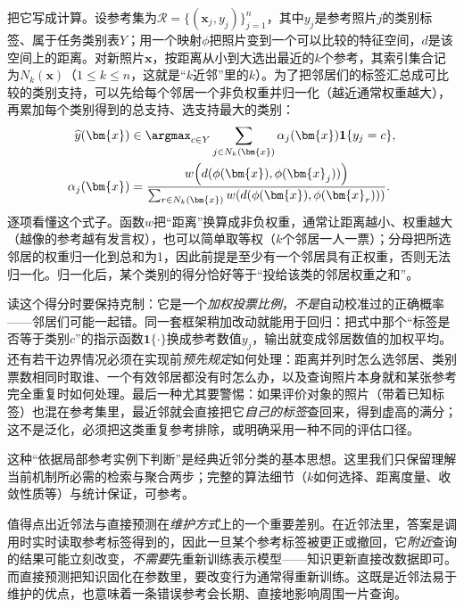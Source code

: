 把它写成计算。设参考集为$\mathcal{R}=\{(\bm{x}_j,y_j)\}_{j=1}^{n}$，其中$y_j$是参考照片$j$的类别标签、属于任务类别表$Y$；用一个映射$\phi$把照片变到一个可以比较的特征空间，$d$是该空间上的距离。对新照片$\bm{x}$，按距离从小到大选出最近的$k$个参考，其索引集合记为$N_k(\bm{x})$（$1\leq k\leq n$，这就是“$k$近邻”里的$k$）。为了把邻居们的标签汇总成可比较的类别支持，可以先给每个邻居一个非负权重并归一化（越近通常权重越大），再累加每个类别得到的总支持、选支持最大的类别：
\begin{equation}
  \begin{aligned}
    \widehat{y}(\bm{x})
    &\in
    \argmax_{c\in Y}
    \sum_{j\in N_k(\bm{x})}
    \alpha_j(\bm{x})\mathbf{1}\{y_j=c\}, \\
    \alpha_j(\bm{x})
    &=
    \frac{w\!\left(d(\phi(\bm{x}),\phi(\bm{x}_j))\right)}
    {\sum_{r\in N_k(\bm{x})}w\!\left(d(\phi(\bm{x}),\phi(\bm{x}_r))\right)}.
  \end{aligned}
  \label{eq:knowledge-acquisition-neighbor-prediction}
\end{equation}
逐项看懂这个式子。函数$w$把“距离”换算成非负权重，通常让距离越小、权重越大（越像的参考越有发言权），也可以简单取等权（$k$个邻居一人一票）；分母把所选邻居的权重归一化到总和为1，因此前提是至少有一个邻居具有正权重，否则无法归一化。归一化后，某个类别的得分恰好等于“投给该类的邻居权重之和”。

读这个得分时要保持克制：它是一个\emph{加权投票比例}，\emph{不是}自动校准过的正确概率——邻居们可能一起错。同一套框架稍加改动就能用于回归：把式中那个“标签是否等于类别$c$”的指示函数$\mathbf{1}\{\cdot\}$换成参考数值$y_j$，输出就变成邻居数值的加权平均。还有若干边界情况必须在实现前\emph{预先规定}如何处理：距离并列时怎么选邻居、类别票数相同时取谁、一个有效邻居都没有时怎么办，以及查询照片本身就和某张参考完全重复时如何处理。最后一种尤其要警惕：如果评价对象的照片（带着已知标签）也混在参考集里，最近邻就会直接把它\emph{自己的标签}查回来，得到虚高的满分；这不是泛化，必须把这类重复参考排除，或明确采用一种不同的评估口径。

这种“依据局部参考实例下判断”是经典近邻分类的基本思想。这里我们只保留理解当前机制所必需的检索与聚合两步；完整的算法细节（$k$如何选择、距离度量、收敛性质等）与统计保证，可参考。

值得点出近邻法与直接预测在\emph{维护方式}上的一个重要差别。在近邻法里，答案是调用时实时读取参考标签得到的，因此一旦某个参考标签被更正或撤回，它\emph{附近}查询的结果可能立刻改变，\emph{不需要}先重新训练表示模型——知识更新直接改数据即可。而直接预测把知识固化在参数里，要改变行为通常得重新训练。这既是近邻法易于维护的优点，也意味着一条错误参考会长期、直接地影响周围一片查询。

